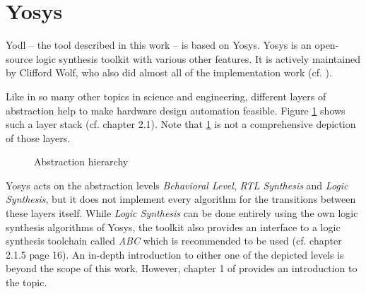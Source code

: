 \section{Yosys}
\label{sec:Yosys}

Yodl -- the tool described in this work -- is based on Yosys. Yosys is
an open-source logic
synthesis toolkit with various other features. It is actively
maintained by Clifford Wolf, who also did almost all of the
implementation work (cf. \cite{YOSYSRM}).

Like in so many other topics in science and engineering, different layers
of abstraction help to make hardware design automation
feasible. Figure \ref{fig:abstractions} shows such a layer
stack (cf. \cite{YOSYSRM} chapter 2.1). Note that
\ref{fig:abstractions} is not a comprehensive depiction of those layers.
%
\begin{figure}[t]
\caption{Abstraction hierarchy}
    \label{fig:abstractions}
\end{figure}
%
Yosys acts on the abstraction levels \emph{Behavioral Level},
\emph{RTL Synthesis} and \emph{Logic Synthesis}, but it does not
implement every algorithm for the transitions between these layers
itself. While \emph{Logic Synthesis} can be done entirely using
the own
logic synthesis algorithms of Yosys, the toolkit also provides an interface to
a logic synthesis toolchain called \emph{ABC} which is recommended to
be used (cf. \cite{YOSYSRM} chapter 2.1.5 page 16).
An in-depth introduction to either one of the depicted levels is
beyond the scope of this work. However, chapter 1 of \cite{MSEM}
provides an introduction to the topic.

